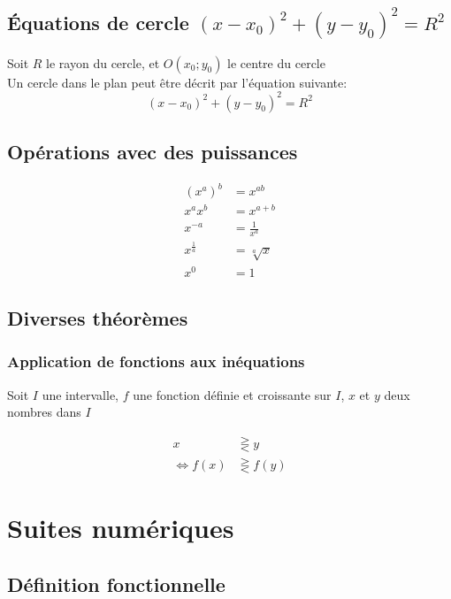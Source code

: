 \documentclass{article}
\begin{document}
\subsection{Équations de cercle $(x - x_0)^2 + (y - y_0)^2 = R^2$}

Soit $R$ le rayon du cercle, et $O(x_0; y_0)$ le centre du cercle\\
Un cercle dans le plan peut être décrit par l'équation suivante:
\[(x - x_0)^2 + (y - y_0)^2 = R^2\]

\subsection{Opérations avec des puissances}

\begin{equation*}
    \begin{split}
        (x^a)^b &= x^{ab} \\
        x^a x^b &= x^{a+b} \\
        x^{-a} &= \frac{1}{x^a} \\
        x^{\frac{1}{a}} &= \sqrt[a]{x} \\
        x^0 &= 1
    \end{split}
\end{equation*}

\subsection{Diverses théorèmes}

\subsubsection{Application de fonctions aux inéquations}

Soit $I$ une intervalle, $f$ une fonction définie et croissante sur $I$, $x$ et $y$ deux nombres dans $I$

\begin{equation*}
    \begin{split}
        x &\gtreqless y \\
\iff    f(x) &\gtreqless f(y)
    \end{split}
\end{equation*}

\newpage\section{Suites numériques}

\subsection{Définition fonctionnelle}
\end{document}
